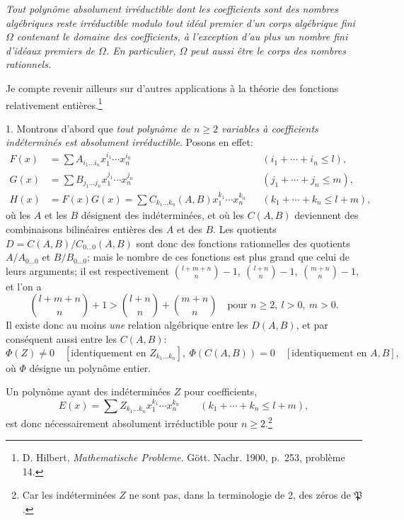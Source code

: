 \documentclass[11pt]{article}
\begin{document}
\emph{Tout polynôme absolument irréductible dont les coefficients sont des nombres algébriques reste irréductible modulo tout idéal premier d'un corps algébrique fini $\Omega$ contenant le domaine des coefficients, à l'exception d'au plus un nombre fini d'idéaux premiers de $\Omega$. En particulier, $\Omega$ peut aussi être le corps des nombres rationnels.}

Je compte revenir ailleurs sur d'autres applications à la théorie des fonctions relativement entières.\footnote{D. Hilbert, \emph{Mathematische Probleme}. Gött. Nachr. 1900, p.~253, problème 14.}

1. Montrons d'abord que \emph{tout polynôme de $n\ge2$ variables à coefficients indéterminés est absolument irréductible}. Posons en effet:
\begin{equation}
\begin{aligned}
F(x)&=\sum A_{i_1\ldots i_n}x_1^{i_1}\cdots x_n^{i_n} &&(i_1+\cdots+i_n\le l),\\
G(x)&=\sum B_{j_1\ldots j_n}x_1^{j_1}\cdots x_n^{j_n} &&(j_1+\cdots+j_n\le m),\\
H(x)&=F(x)G(x)=\sum C_{k_1\ldots k_n}(A,B)x_1^{k_1}\cdots x_n^{k_n} &&(k_1+\cdots+k_n\le l+m),
\end{aligned}
\tag{1}
\end{equation}
où les $A$ et les $B$ désignent des indéterminées, et où les $C(A,B)$ deviennent des combinaisons bilinéaires entières des $A$ et des $B$. Les quotients $D=C(A,B)/C_{0\ldots0}(A,B)$
sont donc des fonctions rationnelles des quotients $A/A_{0\ldots0}$ et $B/B_{0\ldots0}$; mais le nombre de ces fonctions est plus grand que celui de leurs arguments; il est respectivement $\binom{l+m+n}{n}-1,\ \binom{l+n}{n}-1,\ \binom{m+n}{n}-1,$ et l'on a
\[
\binom{l+m+n}{n}+1>
\binom{l+n}{n}+\binom{m+n}{n}
\quad\text{pour } n\ge2,\ l>0,\ m>0.
\]
Il existe donc au moins \emph{une} relation algébrique entre les $D(A,B)$, et par conséquent aussi entre les $C(A,B)$:
\begin{equation}
 \Phi(Z)\ne0\quad[\text{identiquement en }Z_{k_1\ldots k_n}],\ 
 \Phi(C(A,B))=0\quad[\text{identiquement en }A,B],
\tag{2}
\end{equation}
où $\Phi$ désigne un polynôme entier.

Un polynôme ayant des indéterminées $Z$ pour coefficients,
\begin{equation}
 E(x)=\sum Z_{k_1\ldots k_n}x_1^{k_1}\cdots x_n^{k_n}
 \qquad(k_1+\cdots+k_n\le l+m),
\tag{3}
\end{equation}
est donc nécessairement absolument irréductible pour $n\ge2$.\footnote{Car les indéterminées $Z$ ne sont pas, dans la terminologie de 2, des zéros de $\mathfrak P$.}
\end{document}
